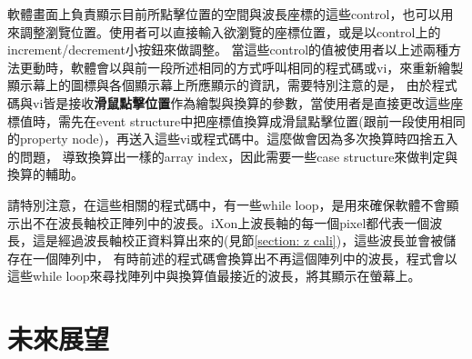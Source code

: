 \documentclass[12pt]{article}
\begin{document}
    軟體畫面上負責顯示目前所點擊位置的空間與波長座標的這些control，也可以用來調整瀏覽位置。使用者可以直接輸入欲瀏覽的座標位置，或是以control上的increment/decrement小按鈕來做調整。
    當這些control的值被使用者以上述兩種方法更動時，軟體會以與前一段所述相同的方式呼叫相同的程式碼或vi，來重新繪製顯示幕上的圖標與各個顯示幕上所應顯示的資訊，需要特別注意的是，
    由於程式碼與vi皆是接收\textbf{滑鼠點擊位置}作為繪製與換算的參數，當使用者是直接更改這些座標值時，需先在event structure中把座標值換算成滑鼠點擊位置(跟前一段使用相同的property node)，再送入這些vi或程式碼中。這麼做會因為多次換算時四捨五入的問題，
    導致換算出一樣的array index，因此需要一些case structure來做判定與換算的輔助。

    請特別注意，在這些相關的程式碼中，有一些while loop，是用來確保軟體不會顯示出不在波長軸校正陣列中的波長。iXon上波長軸的每一個pixel都代表一個波長，這是經過波長軸校正資料算出來的(見節\ref{section: z cali})，這些波長並會被儲存在一個陣列中，
    有時前述的程式碼會換算出不再這個陣列中的波長，程式會以這些while loop來尋找陣列中與換算值最接近的波長，將其顯示在螢幕上。
    \section{未來展望}
    \printbibliography
\end{document}

